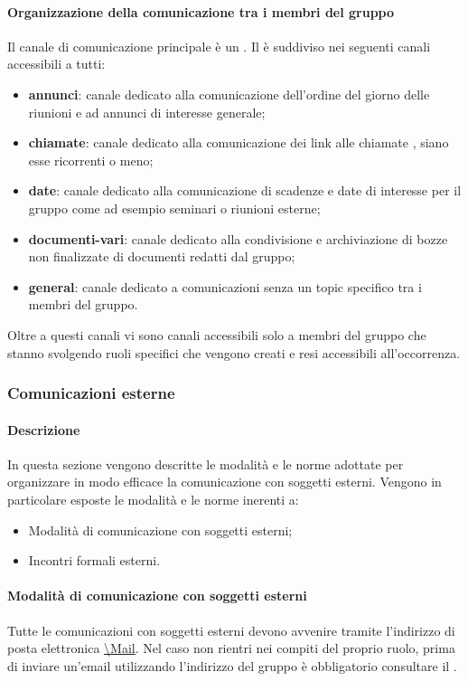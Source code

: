 \paragraph{Organizzazione della comunicazione tra i membri del gruppo}
Il canale di comunicazione principale è un  .
Il  è suddiviso nei seguenti canali accessibili a tutti:
\begin{itemize}
\item \textbf{annunci}: canale dedicato alla comunicazione dell'ordine del giorno delle riunioni e ad annunci di interesse generale;
\item \textbf{chiamate}: canale dedicato alla comunicazione dei link alle chiamate , siano esse ricorrenti o meno;
\item \textbf{date}: canale dedicato alla comunicazione di scadenze e date di interesse per il gruppo come ad esempio seminari o riunioni esterne;
\item \textbf{documenti-vari}: canale dedicato alla condivisione e archiviazione di bozze non finalizzate di documenti redatti dal gruppo;
\item \textbf{general}: canale dedicato a comunicazioni senza un topic specifico tra i membri del gruppo.
\end{itemize}
Oltre a questi canali vi sono canali accessibili solo a membri del gruppo che stanno svolgendo ruoli specifici che vengono creati e resi accessibili all'occorrenza.
\subsubsection{Comunicazioni esterne}
\paragraph{Descrizione}
In questa sezione vengono descritte le modalità e le norme adottate per organizzare in modo efficace la comunicazione con soggetti esterni.
Vengono in particolare esposte le modalità e le norme inerenti a:
\begin{itemize}
\item Modalità di comunicazione con soggetti esterni;
\item Incontri formali esterni.
\end{itemize}
\paragraph{Modalità di comunicazione con soggetti esterni}
Tutte le comunicazioni con soggetti esterni devono avvenire tramite l'indirizzo di posta elettronica \url{\Mail}. Nel caso non rientri nei compiti del proprio ruolo, prima di inviare un'email utilizzando l'indirizzo del gruppo è obbligatorio consultare il \RdP{}.
